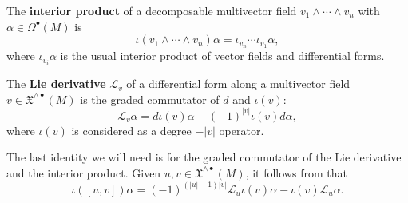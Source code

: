 \documentclass[a4paper,12pt]{scrartcl}
\newcommand{\LX}{\mathfrak{X}^{\wedge {\bullet}}}
\renewcommand{\L}{\mathcal{L}}
\renewcommand{\deg}[1]{\left \lvert #1 \right \rvert}
\begin{document}
\begin{itemize}
The \textbf{interior product} of a decomposable
multivector field $v_{1} \wedge \cdots \wedge v_{n}$ with $\alpha \in \Omega^{\bullet}(M)$ is
\begin{equation} \label{interior}
\iota(v_{1} \wedge \cdots \wedge v_{n}) \alpha = \iota_{v_{n}} \cdots
\iota_{v_{1}} \alpha,
\end{equation}
where $\iota_{v_{i}} \alpha$ is the usual interior product of vector
fields and differential forms. 

The \textbf{Lie derivative} $\L_{v}$ of a differential form along a multivector field $v \in
\LX(M)$ is the graded commutator of $d$ and $\iota(v)$:
\begin{equation} \label{Lie}
\L_{v} \alpha =  d \iota(v) \alpha - (-1)^{\deg{v}} \iota(v) d\alpha,
\end{equation}
where $\iota(v)$ is considered as a degree $-\deg{v}$ operator.

The last identity we will need is for the graded commutator of
the Lie derivative and the interior product. Given $u,v \in
\LX(M)$, it follows from  \cite[Proposition A3]{Forger} that
\begin{equation} \label{commutator}
\iota([u,v]) \alpha = (-1)^{(\deg{u}-1)\deg{v}} \L_{u} \iota(v)  \alpha - \iota(v)\L_{u} \alpha.
\end{equation}
			
	\end{itemize}
\end{document}
